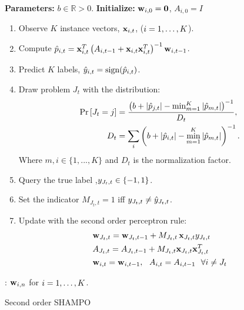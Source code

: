 \begin{algorithm}[!h]
\begin{algorithmic}
   \State \textbf{Parameters:}  $b\in\mathbb{R}>0$.
   \State \textbf{Initialize:} $\mathbf{w}_{i,0}={\boldsymbol{0}}$, $A_{i,0}=I$ \\
     \begin{enumerate}
     \nolineskips
     \item Observe $K$ instance vectors, $\mathbf{x}_{i,t}$, ($i=1 , \ldots , K$).
     \item Compute  $\hat{p}_{i,t}=\mathbf{x}_{i,t}^T \left({A_{i,t-1}+\mathbf{x}_{i,t}\mathbf{x}_{i,t}^T}\right)^{-1}\mathbf{w}_{i,t-1}$.
     \item Predict $K$ labels, $\hat{y}_{i,t}={\rm sign}(\hat{p}_{i,t})$.
     \item Draw problem $J_t$  with the distribution:
      \begin{align}
    {\rm Pr}\left[{J_t=j}\right] &=
    \frac{\left({b+\left\vert{\hat{p}_{j,t}}\right\vert-\min_{m=1}^K\left\vert{\hat{p}_{m,t}}\right\vert}\right)^{-1}}{D_{t}},\nonumber\\
    D_t &=\sum_i \left({b+\left\vert{\hat{p}_{i,t}}\right\vert-\min_{m=1}^K\left\vert{\hat{p}_{m,t}}\right\vert}\right)^{-1}. \nonumber
     \end{align}
     Where $m,i\in\{1,...,K\}$ and $D_t$ is the normalization factor. 
  \item Query the true label ,$y_{J_t,t}\in\{-1,1\}$.
  \item Set the indicator $M_{J_t, t}=1$ iff $y_{J_t,t} \neq \hat{y}_{J_t,t}$.
  \item Update with the second order perceptron rule:     
     \begin{align*}
     &\mathbf{w}_{J_t,t} = \mathbf{w}_{J_t,t-1}+M_{J_t,t}\,  \mathbf{x}_{J_t,t}  y_{J_t,t}\\
     &A_{J_t,t}=A_{J_t,t-1}+ M_{J_t,t}\mathbf{x}_{J_t,t}\mathbf{x}_{J_t,t}^T \\
     &\mathbf{w}_{i,t} = \mathbf{w}_{i,t-1}, ~~ A_{i,t}=A_{i,t-1} ~~ \forall i\ne J_t
     \end{align*}
     \end{enumerate}
   \EndFor  
   : $\mathbf{w}_{i,n}$ for $i=1 , \ldots , K$.
\end{algorithmic}
\caption{Second order SHAMPO }\label{alg:SO_SHAMPO}
\end{algorithm}


